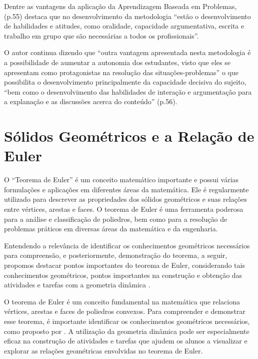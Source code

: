 Dentre as vantagens da aplicação da Aprendizagem Baseada em Problemas,  (p.55) destaca que no desenvolvimento da metodologia ``estão o desenvolvimento de habilidades e atitudes, como oralidade, capacidade argumentativa, escrita e trabalho em grupo que são necessárias a todos os profissionais''.

O autor continua dizendo que ``outra vantagem apresentada nesta metodologia é a possibilidade de aumentar a autonomia dos estudantes, visto que eles se apresentam como protagonistas na resolução das situações-problemas'' o que possibilita o desenvolvimento principalmente da capacidade decisiva do sujeito, ``bem como o desenvolvimento das habilidades de interação e argumentação para a explanação e as discussões acerca do conteúdo'' (p.56).

\section{Sólidos Geométricos e a Relação de Euler}

O ``Teorema de Euler'' é um conceito matemático importante e possui várias formulações e aplicações em diferentes áreas da matemática. Ele é regularmente utilizado para descrever as propriedades dos sólidos geométricos e suas relações entre vértices, arestas e faces. O teorema de Euler é uma ferramenta poderosa para a análise e classificação de poliedros, bem como para a resolução de problemas práticos em diversas áreas da matemática e da engenharia.

\begin{citacao}
    Entendendo a relevância de identificar os conhecimentos geométricos necessários para compreensão, e posteriormente, demonstração do teorema, a seguir, propomos destacar pontos importantes do teorema de Euler, considerando tais conhecimentos geométricos, pontos importantes na construção e obtenção das atividades e tarefas com a geometria dinâmica  \cite{Pereira2022}.
\end{citacao}

O teorema de Euler é um conceito fundamental na matemática que relaciona vértices, arestas e faces de poliedros convexos. Para compreender e demonstrar esse teorema, é importante identificar os conhecimentos geométricos necessários, como proposto por \cite{Pereira2022}. A utilização da geometria dinâmica pode ser especialmente eficaz na construção de atividades e tarefas que ajudem os alunos a visualizar e explorar as relações geométricas envolvidas no teorema de Euler.

